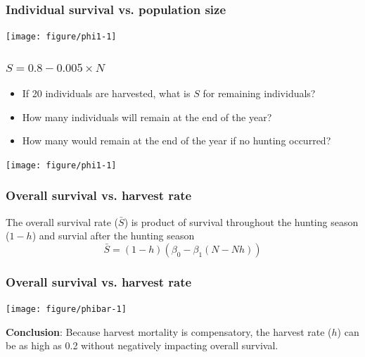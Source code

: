 \documentclass[color=usenames,dvipsnames]{beamer}\usepackage[]{graphicx}\usepackage[]{color}
\begin{document}
\begin{frame}[fragile]
  \frametitle{Individual survival vs. population size}

\centering
\texttt{[image: figure/phi1-1]} \\
\end{frame}





\begin{frame}
  \frametitle{$S = 0.8 - 0.005 \times N$}
  \begin{itemize}[<+->]
    \small
    \item If 20 individuals are harvested, what is $S$ for
      remaining individuals?
    \item How many individuals will remain at the end of the year?
    \item How many would remain at the end of the year if no hunting
      occurred?
  \end{itemize}
  \begin{center}
    \texttt{[image: figure/phi1-1]}
  \end{center}
\end{frame}




\begin{frame}
  \frametitle{Overall survival vs. harvest rate}
  The overall survival rate ($\bar{S}$) is product of survival
  throughout the hunting season ($1-h$) and survial after the hunting
  season
  \Large
  \[
    \bar{S} = (1-h)(\beta_0 - \beta_1 (N - Nh))
  \]
\end{frame}


\begin{frame}[fragile]
  \frametitle{Overall survival vs. harvest rate}
  \vspace{-0.5cm}

\begin{center}
  \texttt{[image: figure/phibar-1]}
\end{center}
\pause
\small
{\bf Conclusion}: Because harvest mortality is compensatory, the
harvest rate ($h$) can be as high as 0.2 without negatively impacting
overall survival.
\end{frame}


\end{document}
